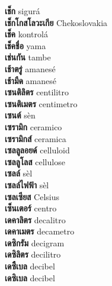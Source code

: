 \textbf{ เช็ก  } sigurá \\
\textbf{ เช็กโกสโลวะเกีย  } Chekoslovakia \\
\textbf{ เช็ค  } kontrolá \\
\textbf{ เช็คชื่อ  } yama \\
\textbf{ เช่นกัน  } tambe \\
\textbf{ เช้าตรู่  } amanesé \\
\textbf{ เช้ามืด  } amanesé \\
\textbf{ เซนติลิตร  } centilitro \\
\textbf{ เซนติเมตร  } centimetro \\
\textbf{ เซนต์  } sèn \\
\textbf{ เซรามิก  } ceramico \\
\textbf{ เซรามิกส์  } ceramica \\
\textbf{ เซลลูลอยด์  } celluloid \\
\textbf{ เซลลูโลส  } cellulose \\
\textbf{ เซลล์  } sèl \\
\textbf{ เซลล์ไฟฟ้า  } sèl \\
\textbf{ เซลเซียส  } Celsius \\
\textbf{ เซ็นเตอร์  } centro \\
\textbf{ เดคาลิตร  } decalitro \\
\textbf{ เดคาเมตร  } decametro \\
\textbf{ เดซิกรัม  } decigram \\
\textbf{ เดซิลิตร  } decilitro \\
\textbf{ เดซิืเบล  } decibel \\
\textbf{ เดซิเบล  } decibel \\
